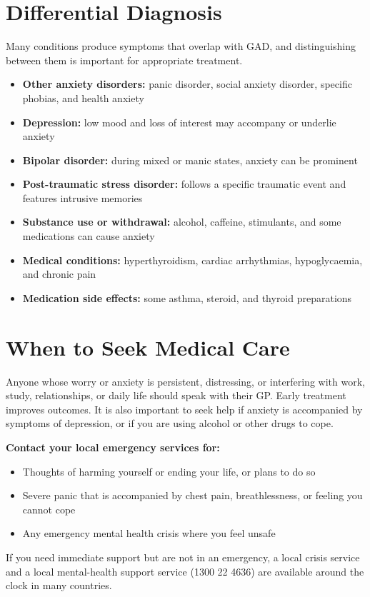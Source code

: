 \section*{Differential Diagnosis}
Many conditions produce symptoms that overlap with GAD, and distinguishing between them is important for appropriate treatment.

\begin{itemize}
    \item \textbf{Other anxiety disorders:} panic disorder, social anxiety disorder, specific phobias, and health anxiety
    \item \textbf{Depression:} low mood and loss of interest may accompany or underlie anxiety
    \item \textbf{Bipolar disorder:} during mixed or manic states, anxiety can be prominent
    \item \textbf{Post-traumatic stress disorder:} follows a specific traumatic event and features intrusive memories
    \item \textbf{Substance use or withdrawal:} alcohol, caffeine, stimulants, and some medications can cause anxiety
    \item \textbf{Medical conditions:} hyperthyroidism, cardiac arrhythmias, hypoglycaemia, and chronic pain
    \item \textbf{Medication side effects:} some asthma, steroid, and thyroid preparations
\end{itemize}

\section*{When to Seek Medical Care}
Anyone whose worry or anxiety is persistent, distressing, or interfering with work, study, relationships, or daily life should speak with their GP. Early treatment improves outcomes. It is also important to seek help if anxiety is accompanied by symptoms of depression, or if you are using alcohol or other drugs to cope.

\textbf{Contact your local emergency services for:}
\begin{itemize}
    \item Thoughts of harming yourself or ending your life, or plans to do so
    \item Severe panic that is accompanied by chest pain, breathlessness, or feeling you cannot cope
    \item Any emergency mental health crisis where you feel unsafe
\end{itemize}
If you need immediate support but are not in an emergency, a local crisis service and a local mental-health support service (1300 22 4636) are available around the clock in many countries.


